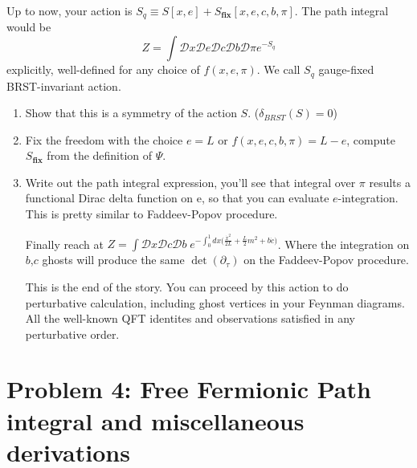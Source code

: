 \documentclass[11pt]{article}
\begin{document}
\begin{enumerate}
\begin{problem}{\points{-}}
	\noindent
	Up to now, your action is $S_q \equiv S[x,e] +S_{\textbf{fix}}[x,e,c,b,\pi]$. The path integral would be
	\[
	Z = \int \mathcal{D}x\mathcal{D}e\mathcal{D}c\mathcal{D}b\mathcal{D}\pi e^{-S_q}
	\]
	explicitly, well-defined for any choice of $f(x,e,\pi)$. We call $S_q$ gauge-fixed BRST-invariant action.
	\begin{enumerate}
		\item Show that this is a symmetry of the action $S$. ($\delta_{BRST}(S) = 0$)
		\item Fix the freedom with the choice $e=L$ or $f(x,e,c,b,\pi) = L-e$, compute $S_{\textbf{fix}}$ from the definition of $\Psi$.
		\item Write out the path integral expression, you'll see that integral over $\pi$ results a functional Dirac delta function on e, so that you can evaluate $e$-integration. This is pretty similar to Faddeev-Popov procedure.
		
		\noindent
		Finally reach at $Z = \int\mathcal{D}x\mathcal{D}c\mathcal{D}b \; e^{-\int_0^1 dx \big(\frac{\dot{x}^2}{2L} + \frac{L}{2} m^2 +b\dot{c}\big)}$. Where the integration on $b$,$c$ ghosts will produce the same $\det(\partial_\tau)$ on the Faddeev-Popov procedure.
		
		\noindent
		This is the end of the story. You can proceed by this action to do perturbative calculation, including ghost vertices in your Feynman diagrams. All the  well-known QFT identites and observations satisfied in any perturbative order.
	\end{enumerate}
	
	
\end{problem}



\end{enumerate}

\newpage
\section*{Problem 4: Free Fermionic Path integral and miscellaneous derivations}
\end{document}
